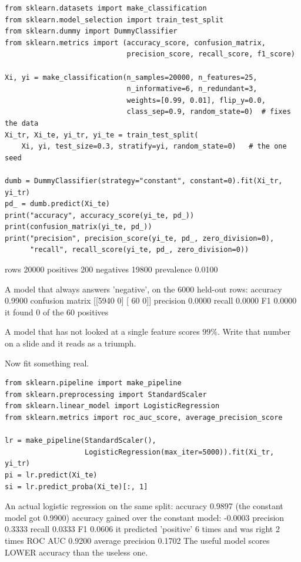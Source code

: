 \documentclass[11pt]{article}
\begin{document}
\begin{lstlisting}
from sklearn.datasets import make_classification
from sklearn.model_selection import train_test_split
from sklearn.dummy import DummyClassifier
from sklearn.metrics import (accuracy_score, confusion_matrix,
                             precision_score, recall_score, f1_score)

Xi, yi = make_classification(n_samples=20000, n_features=25,
                             n_informative=6, n_redundant=3,
                             weights=[0.99, 0.01], flip_y=0.0,
                             class_sep=0.9, random_state=0)  # fixes the data
Xi_tr, Xi_te, yi_tr, yi_te = train_test_split(
    Xi, yi, test_size=0.3, stratify=yi, random_state=0)   # the one seed

dumb = DummyClassifier(strategy="constant", constant=0).fit(Xi_tr, yi_tr)
pd_ = dumb.predict(Xi_te)
print("accuracy", accuracy_score(yi_te, pd_))
print(confusion_matrix(yi_te, pd_))
print("precision", precision_score(yi_te, pd_, zero_division=0),
      "recall", recall_score(yi_te, pd_, zero_division=0))
\end{lstlisting}
\begin{codeout}
rows 20000   positives 200   negatives 19800   prevalence 0.0100

A model that always answers 'negative', on the 6000 held-out rows:
  accuracy  0.9900
  confusion matrix
[[5940    0]
 [  60    0]]
  precision 0.0000   recall 0.0000   F1 0.0000
  it found 0 of the 60 positives
\end{codeout}

A model that has not looked at a single feature scores $99\%$. Write that
number on a slide and it reads as a triumph.

Now fit something real.

\begin{lstlisting}
from sklearn.pipeline import make_pipeline
from sklearn.preprocessing import StandardScaler
from sklearn.linear_model import LogisticRegression
from sklearn.metrics import roc_auc_score, average_precision_score

lr = make_pipeline(StandardScaler(),
                   LogisticRegression(max_iter=5000)).fit(Xi_tr, yi_tr)
pi = lr.predict(Xi_te)
si = lr.predict_proba(Xi_te)[:, 1]
\end{lstlisting}
\begin{codeout}
An actual logistic regression on the same split:
  accuracy  0.9897  (the constant model got 0.9900)
  accuracy gained over the constant model: -0.0003
  precision 0.3333   recall 0.0333   F1 0.0606
  it predicted 'positive' 6 times and was right 2 times
  ROC AUC   0.9200   average precision 0.1702
The useful model scores LOWER accuracy than the useless one.
\end{codeout}
\end{document}
